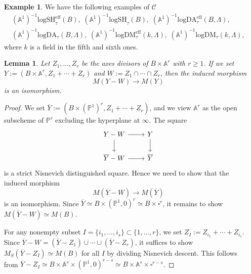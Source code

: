 \documentclass[10pt]{amsart}
\newtheorem{lem}[thm]{Lemma}
\theoremstyle{definition}
\newtheorem{exm}[thm]{Example}
\theoremstyle{remark}
\numberwithin{equation}{subsection}
\newcommand{\A}{\mathbb{A}}
\renewcommand{\P}{\mathbb{P}}
\newcommand{\cC}{\mathcal{C}}
\newcommand{\ol}{\overline}
\newcommand{\eff}{{\mathrm{eff}}}
\newcommand{\boxx}{\square}
\newcommand{\logSH}{\mathrm{logSH}}
\newcommand{\logDA}{\mathrm{log}\mathrm{DA}}
\newcommand{\logDM}{\mathrm{log}{\mathrm{DM}}}
\begin{document}
\begin{exm}
\label{2.4}
We have the following examples of $\cC$
\begin{gather*}
(\A^1)^{-1}\logSH_{\tau}^\eff(B),
\;
(\A^1)^{-1}\logSH_{\tau}(B),
\;
(\A^1)^{-1}\logDA_{\tau}^\eff(B,\Lambda),
\\
(\A^1)^{-1}\logDA_{\tau}(B,\Lambda),
\;
(\A^1)^{-1}\logDM_{\tau}^\eff(k,\Lambda),
\;
(\A^1)^{-1}\logDM_{\tau}(k,\Lambda),
\end{gather*}
where $k$ is a field in the fifth and sixth ones.
\end{exm}






\begin{lem}
\label{2.2}
Let $Z_1,\ldots,Z_r$ be the axes divisors of $B\times \A^r$ with $r\geq 1$.
If we set $Y:=(B\times \A^r,Z_1+\cdots+Z_r)$ and $W:=Z_1\cap \cdots \cap Z_r$, then the induced morphism
\[
M(Y-W)
\to
M(Y)
\]
is an isomorphism.
\end{lem}
\begin{proof}
We set $\ol{Y}:=(B\times (\P^1)^r,Z_1+\cdots+Z_r)$, and we view $\A^r$ as the open subscheme of $\P^r$ excluding the hyperplane at $\infty$.
The square
\[
\begin{tikzcd}
Y-W\ar[d]\ar[r]&
Y\ar[d]
\\
\ol{Y}-W\ar[r]&
\ol{Y}
\end{tikzcd}
\]
is a strict Nisnevich distinguished square.
Hence we need to show that the induced morphism
\[
M(\ol{Y}-W)\to M(\ol{Y})
\]
is an isomorphism.
Since $\ol{Y}\simeq B\times (\P^1,0)^r \simeq B\times \boxx^r$, it remains to show $M(\ol{Y}-W)\simeq M(B)$.

For any nonempty subset $I=\{i_1,\ldots,i_s\}\subset \{1,\ldots,r\}$, we set $Z_I:=Z_{i_1}+ \cdots + Z_{i_s}$.
Since $\ol{Y}-W=(\ol{Y}-Z_1)\cup \cdots \cup (\ol{Y}-Z_r)$, it suffices to show $M_S(\ol{Y}-Z_I)\simeq M(B)$ for all $I$ by dividing Nisnevich descent.
This follows from $\ol{Y}-Z_I\simeq B\times \A^s \times (\P^1,0)^{r-s}\simeq B\times \A^s \times \boxx^{r-s}$.
\end{proof}
\end{document}
